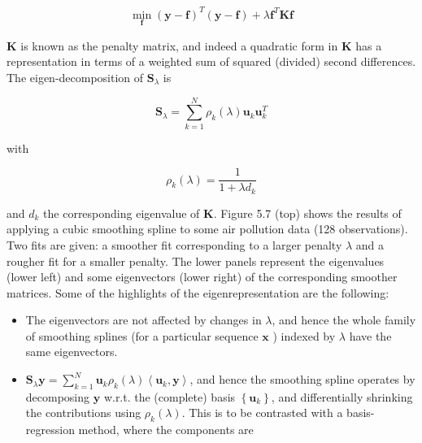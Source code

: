 \documentclass[10pt]{article}
\begin{document}
\begin{equation*}
\min _{\mathbf{f}}(\mathbf{y}-\mathbf{f})^{T}(\mathbf{y}-\mathbf{f})+\lambda \mathbf{f}^{T} \mathbf{K} \mathbf{f} \tag{5.18}
\end{equation*}


$\mathbf{K}$ is known as the penalty matrix, and indeed a quadratic form in $\mathbf{K}$ has a representation in terms of a weighted sum of squared (divided) second differences. The eigen-decomposition of $\mathbf{S}_{\lambda}$ is


\begin{equation*}
\mathbf{S}_{\lambda}=\sum_{k=1}^{N} \rho_{k}(\lambda) \mathbf{u}_{k} \mathbf{u}_{k}^{T} \tag{5.19}
\end{equation*}


with


\begin{equation*}
\rho_{k}(\lambda)=\frac{1}{1+\lambda d_{k}} \tag{5.20}
\end{equation*}


and $d_{k}$ the corresponding eigenvalue of $\mathbf{K}$. Figure 5.7 (top) shows the results of applying a cubic smoothing spline to some air pollution data (128 observations). Two fits are given: a smoother fit corresponding to a larger penalty $\lambda$ and a rougher fit for a smaller penalty. The lower panels represent the eigenvalues (lower left) and some eigenvectors (lower right) of the corresponding smoother matrices. Some of the highlights of the eigenrepresentation are the following:

\begin{itemize}
  \item The eigenvectors are not affected by changes in $\lambda$, and hence the whole family of smoothing splines (for a particular sequence $\mathbf{x}$ ) indexed by $\lambda$ have the same eigenvectors.
  \item $\mathbf{S}_{\lambda} \mathbf{y}=\sum_{k=1}^{N} \mathbf{u}_{k} \rho_{k}(\lambda)\left\langle\mathbf{u}_{k}, \mathbf{y}\right\rangle$, and hence the smoothing spline operates by decomposing $\mathbf{y}$ w.r.t. the (complete) basis $\left\{\mathbf{u}_{k}\right\}$, and differentially shrinking the contributions using $\rho_{k}(\lambda)$. This is to be contrasted with a basis-regression method, where the components are
\end{itemize}
\end{document}

